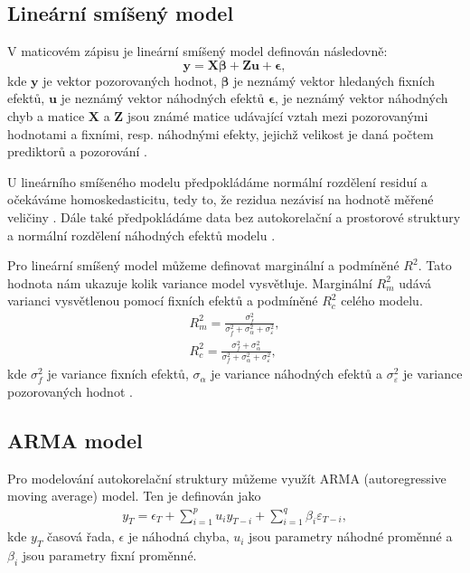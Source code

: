 \subsection{Lineární smíšený model}\label{chap:lme}
V maticovém zápisu je lineární smíšený model definován následovně: \parencite{mcleanrobert1991}
$$\boldsymbol{y} = \boldsymbol{X}\boldsymbol{\beta} + \boldsymbol{Z}\boldsymbol{u} + \boldsymbol{\epsilon},$$ \label{eq:linearmixedeffectmodel}
kde $\mathbf{y}$ je vektor pozorovaných hodnot, $\mathbf{\beta}$ je neznámý vektor hledaných fixních efektů, $\mathbf{u}$ je neznámý vektor náhodných efektů $\mathbf{\epsilon}$, je neznámý vektor náhodných chyb a matice $\mathbf{X}$ a $\mathbf{Z}$ jsou známé matice udávající vztah mezi pozorovanými hodnotami a fixními, resp. náhodnými efekty, jejichž velikost je daná počtem prediktorů a pozorování \parencite{mcleanrobert1991}.

U lineárního smíšeného modelu předpokládáme normální rozdělení residuí a očekáváme homoskedasticitu, tedy to, že rezidua nezávisí na hodnotě měřené veličiny \parencite{homoscedasticity}. Dále také předpokládáme data bez autokorelační a prostorové struktury a normální rozdělení náhodných efektů modelu \parencite{hefleytrevorj2017}. 

Pro lineární smíšený model můžeme definovat marginální a podmíněné $R^2$. Tato hodnota nám ukazuje kolik variance model vysvětluje. Marginální $R_m^2$ udává varianci vysvětlenou pomocí fixních efektů a podmíněné $R_c^2$ celého modelu.
\begin{gather}
	R_m^2 = \frac{\sigma_f^2}{\sigma_f^2+\sigma_{\alpha}^2+\sigma_{\varepsilon}^2},\\
	R_c^2 = \frac{\sigma_f^2+\sigma_{\alpha}^2}{\sigma_f^2+\sigma_{\alpha}^2+\sigma_{\varepsilon}^2},
\end{gather}
kde $\sigma_f^2$ je variance fixních efektů, $\sigma_{\alpha}$ je variance náhodných efektů a $\sigma_{\varepsilon}^2$ je variance pozorovaných hodnot \parencite{lmersquared}.

\subsection{ARMA model}
Pro modelování autokorelační struktury můžeme využít ARMA (autoregressive moving average) model. Ten je definován jako \parencite{wilsongranville2016}
\begin{gather*}
y_T = \epsilon_T + \sum_{i=1}^{p}u_i y_{T-i} + \sum_{i=1}^{q}\beta_i\varepsilon_{T-i},
\end{gather*}
kde $y_T$ časová řada, $\epsilon$ je náhodná chyba, $u_i$ jsou parametry náhodné proměnné a $\beta_i$ jsou parametry fixní proměnné. 

